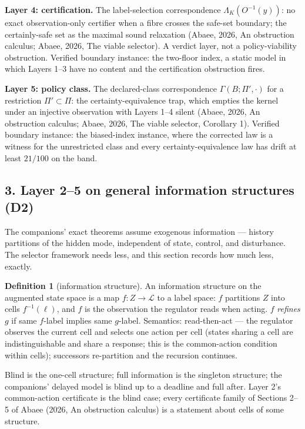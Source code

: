 \documentclass[10pt,twocolumn]{article}
\theoremstyle{definition}
\newtheorem{definition}{Definition}
\begin{document}
\textbf{Layer 4: certification.} The label-selection correspondence
\(\Lambda_{K}(O^{-1}(y))\): no exact observation-only certifier when a
fibre crosses the safe-set boundary; the certainly-safe set as the maximal
sound relaxation (Abaee, 2026, An obstruction calculus; Abaee, 2026, The viable selector). A verdict layer, not a
policy-viability obstruction. Verified boundary instance: the two-floor
index, a static model in which Layers 1--3 have no content and the
certification obstruction fires.

\textbf{Layer 5: policy class.} The declared-class correspondence
\(\Gamma(B; \Pi', \cdot)\) for a restriction \(\Pi' \subset \Pi\): the
certainty-equivalence trap, which empties the kernel under an injective
observation with Layers 1--4 silent (Abaee, 2026, An obstruction calculus; Abaee, 2026, The viable selector, Corollary 1).
Verified boundary instance: the biased-index instance, where the corrected
law is a witness for the unrestricted class and every
certainty-equivalence law has drift at least \(21/100\) on the band.

\subsection{3. Layer 2--5 on general information structures (D2)}\label{gis}

The companions' exact theorems assume exogenous information --- history
partitions of the hidden mode, independent of state, control, and
disturbance. The selector framework needs less, and this section records
how much less, exactly.

\begin{definition}[information structure]\label{def:struct}
An information structure on the augmented state space is a map
\(f: Z \to \mathcal{L}\) to a label space: \(f\) partitions
\(Z\) into cells \(f^{-1}(\ell)\), and \(f\) is the observation the
regulator reads when acting. \(f\) \emph{refines} \(g\) if same
\(f\)-label implies same \(g\)-label. Semantics: read-then-act --- the
regulator observes the current cell and selects one action per cell
(states sharing a cell are indistinguishable and share a response; this is
the common-action condition within cells); successors re-partition and the
recursion continues.
\end{definition}

Blind is the one-cell structure; full information is the singleton
structure; the companions' delayed model is blind up to a deadline and full
after. Layer 2's common-action certificate is the blind case; every
certificate family of Sections 2--5 of Abaee (2026, An obstruction calculus) is a statement about
cells of some structure.
\end{document}
